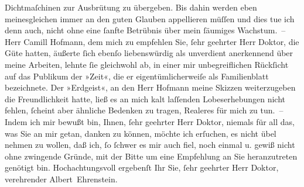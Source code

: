                Dichtmaſchinen zur Ausbrütung zu übergeben. Bis dahin werden eben meinesgleichen
               immer an den guten Glauben appellieren müſſen und dies tue ich denn auch, nicht ohne
               eine{ }ſanfte Betrübnis über mein{ }ſäumiges Wachstum. – Herr Camill Hofmann, dem mich zu empfehlen Sie,{ }ſehr geehrter Herr
               Doktor, die Güte hatten, äußerte{ }ſich ebenſo liebenswürdig als unverdient anerkennend
               über meine Arbeiten, lehnte{ }ſie gleichwohl ab, in einer {\pb}mir unbegreiflichen Rückſicht auf das
               Publikum der »Zeit«, die er eigentümlicherweiſe
               als Familienblatt bezeichnete. Der »Erdgeist«, an
               den Herr Hofmann meine Skizzen weiterzugeben
               die Freundlichkeit hatte, ließ es an mich kalt laſſenden Lobeserhebungen nicht
               fehlen,{ }ſcheint aber ähnliche Bedenken zu tragen, Realeres für mich zu tun. – Indem
               ich mir bewußt bin, Ihnen,{ }ſehr geehrter Herr Doktor, niemals für all das, was Sie an
               mir getan, danken zu können, möchte ich erſuchen, es nicht übel nehmen zu wollen, daß
               ich,{ }ſo{ }ſchwer es mir auch fiel, noch einmal u. gewiß nicht ohne zwingende Gründe,
               mit der Bitte um eine Empfehlung an Sie heranzutreten genötigt bin. Hochachtungsvoll
               ergebenſt Ihr Sie,{ }ſehr geehrter Herr Doktor, verehrender\pend
           \pstart \spacefill\mbox{Albert Ehrenstein.}\pend{}\endnumbering{}  \newcommand{\dateiname}{L01826}\newcommand{\titel}{Albert Ehrenstein an Arthur Schnitzler, 24. 1. 1909}\newcommand{\editorInnen}{Martin Anton Müller und Gerd-Hermann Susen}

